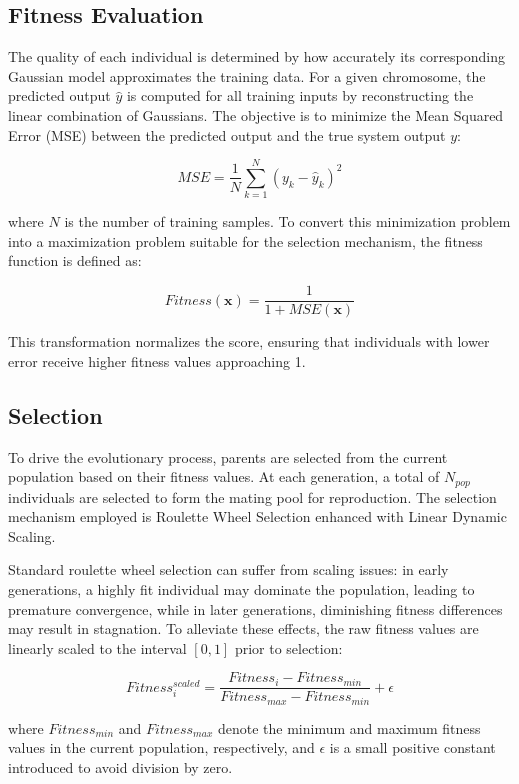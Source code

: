 \documentclass[11pt]{article}
\begin{document}
\subsection{Fitness Evaluation}

The quality of each individual is determined by how accurately its corresponding Gaussian model approximates the training data. For a given chromosome, the predicted output $\hat{y}$ is computed for all training inputs by reconstructing the linear combination of Gaussians. The objective is to minimize the Mean Squared Error (MSE) between the predicted output and the true system output $y$:

$$MSE = \frac{1}{N} \sum_{k=1}^{N} (y_k - \hat{y}_k)^2$$

where $N$ is the number of training samples. To convert this minimization problem into a maximization problem suitable for the selection mechanism, the fitness function is defined as:

$$Fitness(\mathbf{x}) = \frac{1}{1 + MSE(\mathbf{x})}$$

This transformation normalizes the score, ensuring that individuals with lower error receive higher fitness values approaching 1.

\subsection{Selection}

To drive the evolutionary process, parents are selected from the current population based on their fitness values. At each generation, a total of $N_{pop}$ individuals are selected to form the mating pool for reproduction. The selection mechanism employed is Roulette Wheel Selection enhanced with Linear Dynamic Scaling.

Standard roulette wheel selection can suffer from scaling issues: in early generations, a highly fit individual may dominate the population, leading to premature convergence, while in later generations, diminishing fitness differences may result in stagnation. To alleviate these effects, the raw fitness values are linearly scaled to the interval $[0,1]$ prior to selection:

$$
Fitness^{scaled}_i = \frac{Fitness_i - Fitness_{min}}{Fitness_{max} - Fitness_{min}} + \epsilon
$$

where $Fitness_{min}$ and $Fitness_{max}$ denote the minimum and maximum fitness values in the current population, respectively, and $\epsilon$ is a small positive constant introduced to avoid division by zero.
\end{document}
